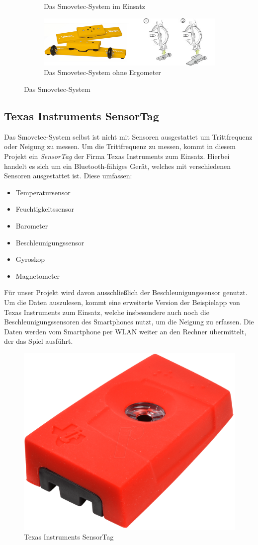 \begin{figure}[ht]
\begin{subfigure}{.4\textwidth}
\caption{Das Smovetec-System im Einsatz}
\end{subfigure}
\begin{subfigure}{.59\textwidth}
\centering
\includegraphics[width=.8\textwidth]{gfx/smovetec2.jpg}
\caption{Das Smovetec-System ohne Ergometer}
\end{subfigure}
\caption{Das Smovetec-System\footnotemark}
\end{figure}

\subsection{Texas Instruments SensorTag}
Das Smovetec-System selbst ist nicht mit Sensoren ausgestattet um Trittfrequenz oder Neigung zu messen. Um die Trittfrequenz zu messen, kommt in diesem Projekt ein \textit{SensorTag} der Firma Texas Instruments zum Einsatz. Hierbei handelt es sich um ein Bluetooth-fähiges Gerät, welches mit verschiedenen Sensoren ausgestattet ist. Diese umfassen:
\begin{itemize}
\item Temperatursensor
\item Feuchtigkeitssensor
\item Barometer
\item Beschleunigungssensor
\item Gyroskop
\item Magnetometer
\end{itemize}
Für unser Projekt wird davon ausschließlich der Beschleunigungssensor genutzt.\\
Um die Daten auszulesen, kommt eine erweiterte Version der Beispielapp von Texas Instruments zum Einsatz, welche insbesondere auch noch die Beschleunigungssensoren des Smartphones nutzt, um die Neigung zu erfassen. Die Daten werden vom Smartphone per WLAN weiter an den Rechner übermittelt, der das Spiel ausführt.
\begin{figure}[ht]
\centering
\includegraphics[width=.5\textwidth]{gfx/sensortag.png}
\caption{Texas Instruments SensorTag}
\end{figure}